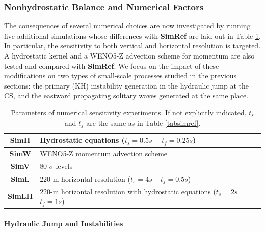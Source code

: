 \subsubsection{Nonhydrostatic Balance and Numerical Factors}
\label{TestNum}
The consequences of several numerical choices are now investigated by running five additional simulations whose differences with \textbf{SimRef} are laid out in Table \ref{tab_sensnum}. In particular, the sensitivity to both vertical and horizontal resolution is targeted. A hydrostatic kernel and a WENO5-Z advection scheme for momentum \citet{Borges2008} are also tested and compared with \textbf{SimRef}. We focus on the impact of these modifications on two types of small-scale processes studied in the previous sections: the primary (KH) instability generation in the hydraulic jump at the CS, and the eastward propagating solitary waves generated at the same place. 

\begin{table}[!h]
\caption{Parameters of numerical sensitivity experiments. If not explicitly indicated, $t_s$ and $t_f$ are the same as in Table \ref{tabsimref}.}
 \centering
  \begin{tabular}{|c|l|}
 \hline
  \textbf{SimH}& Hydrostatic equations ($t_s=0.5s$ ~ $t_f=0.25s$)\\
  \hline
  \textbf{SimW}& WENO5-Z momentum advection scheme\\
  \hline
  \textbf{SimV}& 80 $\sigma$-levels\\
  \hline
  \textbf{SimL}& 220-m horizontal resolution ($t_s=4s$ ~ $t_f=0.5s$)\\
  \hline
  \textbf{SimLH}& 220-m horizontal resolution with hydrostatic equations ($t_s=2s$ ~ $t_f=1s$)\\
  \hline
 \end{tabular}
	\label{tab_sensnum}
\end{table}

\paragraph{Hydraulic Jump and Instabilities}


